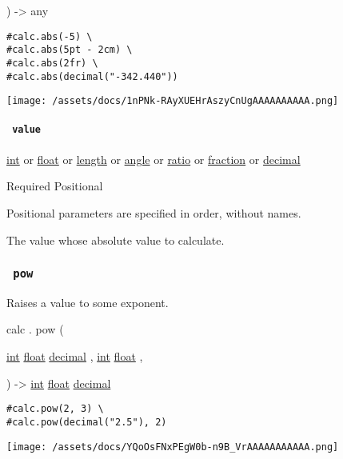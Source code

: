 ) -\textgreater{} { any }

\begin{verbatim}
#calc.abs(-5) \
#calc.abs(5pt - 2cm) \
#calc.abs(2fr) \
#calc.abs(decimal("-342.440"))
\end{verbatim}

\texttt{[image: /assets/docs/1nPNk-RAyXUEHrAszyCnUgAAAAAAAAAA.png]}

\paragraph{\texorpdfstring{\texttt{\ value\ }}{ value }}\label{functions-abs-value}

\href{/docs/reference/foundations/int/}{int} {or}
\href{/docs/reference/foundations/float/}{float} {or}
\href{/docs/reference/layout/length/}{length} {or}
\href{/docs/reference/layout/angle/}{angle} {or}
\href{/docs/reference/layout/ratio/}{ratio} {or}
\href{/docs/reference/layout/fraction/}{fraction} {or}
\href{/docs/reference/foundations/decimal/}{decimal}

{Required} {{ Positional }}

\label{functions-abs-value-positional-tooltip}
Positional parameters are specified in order, without names.

The value whose absolute value to calculate.

\subsubsection{\texorpdfstring{\texttt{\ pow\ }}{ pow }}\label{functions-pow}

Raises a value to some exponent.

calc { . } { pow } (

{ \href{/docs/reference/foundations/int/}{int}
\href{/docs/reference/foundations/float/}{float}
\href{/docs/reference/foundations/decimal/}{decimal} , } {
\href{/docs/reference/foundations/int/}{int}
\href{/docs/reference/foundations/float/}{float} , }

) -\textgreater{} \href{/docs/reference/foundations/int/}{int}
\href{/docs/reference/foundations/float/}{float}
\href{/docs/reference/foundations/decimal/}{decimal}

\begin{verbatim}
#calc.pow(2, 3) \
#calc.pow(decimal("2.5"), 2)
\end{verbatim}

\texttt{[image: /assets/docs/YQoOsFNxPEgW0b-n9B\_VrAAAAAAAAAAA.png]}

